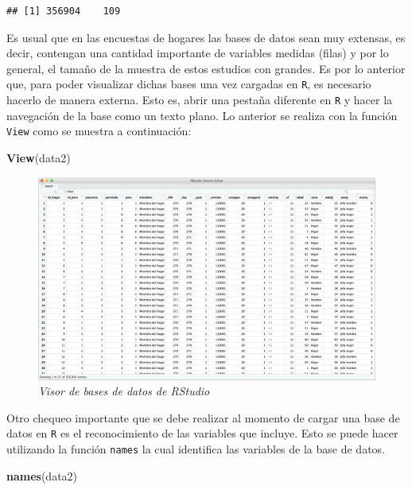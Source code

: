 \documentclass[
  spanish,
  12pt,
]{book}
\newenvironment{Shaded}{\begin{snugshade}}{\end{snugshade}}
\newcommand{\FunctionTok}[1]{\textcolor[rgb]{0.13,0.29,0.53}{\textbf{#1}}}
\newcommand{\NormalTok}[1]{#1}
\begin{document}
\begin{verbatim}
## [1] 356904    109
\end{verbatim}

Es usual que en las encuestas de hogares las bases de datos sean muy extensas, es decir, contengan una cantidad importante de variables medidas (filas) y por lo general, el tamaño de la muestra de estos estudios con grandes. Es por lo anterior que, para poder visualizar dichas bases una vez cargadas en \texttt{R}, es necesario hacerlo de manera externa. Esto es, abrir una pestaña diferente en \texttt{R} y hacer la navegación de la base como un texto plano. Lo anterior se realiza con la función \texttt{View} como se muestra a continuación:

\begin{Shaded}
\begin{Highlighting}[]
\FunctionTok{View}\NormalTok{(data2)}
\end{Highlighting}
\end{Shaded}

\begin{figure}
\centering
\includegraphics[width=8.85417in,height=\textheight,keepaspectratio]{Imagenes/Cap 0/1.png}
\caption{\emph{Visor de bases de datos de RStudio}}
\end{figure}

Otro chequeo importante que se debe realizar al momento de cargar una base de datos en \texttt{R} es el reconocimiento de las variables que incluye. Esto se puede hacer utilizando la función \texttt{names} la cual identifica las variables de la base de datos.

\begin{Shaded}
\begin{Highlighting}[]
\FunctionTok{names}\NormalTok{(data2)}
\end{Highlighting}
\end{Shaded}
\end{document}
